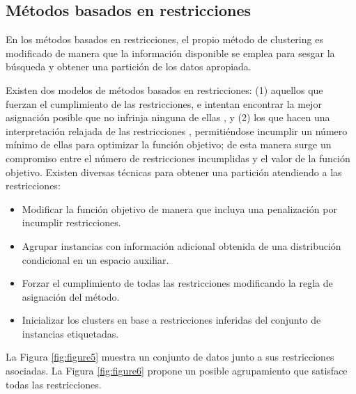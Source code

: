 \subsection{Métodos basados en restricciones}

En los métodos basados en restricciones, el propio método de clustering es modificado de manera que la información disponible se emplea para sesgar la búsqueda y obtener una partición de los datos apropiada.

Existen dos modelos de métodos basados en restricciones: (1) aquellos que fuerzan el cumplimiento de las restricciones, e intentan encontrar la mejor asignación posible que no infrinja ninguna de ellas \cite{Wagstaff:2001b}\cite{DavidsonRavi:2005b}, y (2) los que hacen una interpretación relajada de las restricciones \cite{Basu:2004}\cite{Seagal:2003}\cite{DavidsonRavi:2005a}\cite{Law:2005}, permitiéndose incumplir un número mínimo de ellas para optimizar la función objetivo; de esta manera surge un compromiso entre el número de restricciones incumplidas y el valor de la función objetivo. Existen diversas técnicas para obtener una partición atendiendo a las restricciones:

\begin{itemize}
	
	\item Modificar la función objetivo de manera que incluya una penalización por incumplir restricciones. \cite{Demiriz:1999} \cite{DavidsonRavi:2005a}
	
	\item Agrupar instancias con información adicional obtenida de una distribución condicional en un espacio auxiliar. \cite{SinkkonenKaski:2000}
	
	\item Forzar el cumplimiento de todas las restricciones modificando la regla de asignación del método. \cite{Wagstaff:2001b}
	
	\item Inicializar los clusters en base a restricciones inferidas del conjunto de instancias etiquetadas.\cite{Basu:2002}
	
\end{itemize}

La Figura \ref{fig:figure5} muestra un conjunto de datos junto a sus restricciones asociadas. La Figura \ref{fig:figure6} propone un posible agrupamiento que satisface todas las restricciones.

